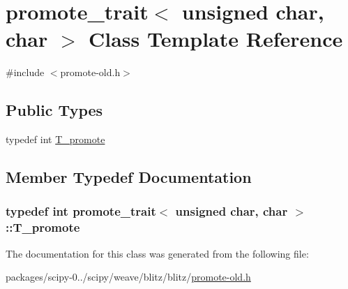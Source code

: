 \hypertarget{classpromote__trait_3_01unsigned_01char_00_01char_01_4}{}\section{promote\+\_\+trait$<$ unsigned char, char $>$ Class Template Reference}
\label{classpromote__trait_3_01unsigned_01char_00_01char_01_4}


{\ttfamily \#include $<$promote-\/old.\+h$>$}

\subsection*{Public Types}
\begin{DoxyCompactItemize}
\item 
typedef int \hyperlink{classpromote__trait_3_01unsigned_01char_00_01char_01_4_af8ba216c70d215aaa1f1b3a5dca53011}{T\+\_\+promote}
\end{DoxyCompactItemize}


\subsection{Member Typedef Documentation}
\hypertarget{classpromote__trait_3_01unsigned_01char_00_01char_01_4_af8ba216c70d215aaa1f1b3a5dca53011}{}
\subsubsection[{T\+\_\+promote}]{\setlength{\rightskip}{0pt plus 5cm}typedef int {\bf promote\+\_\+trait}$<$ unsigned char, char $>$\+::{\bf T\+\_\+promote}}\label{classpromote__trait_3_01unsigned_01char_00_01char_01_4_af8ba216c70d215aaa1f1b3a5dca53011}


The documentation for this class was generated from the following file\+:\begin{DoxyCompactItemize}
\item 
packages/scipy-\/0../scipy/weave/blitz/blitz/\hyperlink{promote-old_8h}{promote-\/old.\+h}\end{DoxyCompactItemize}
